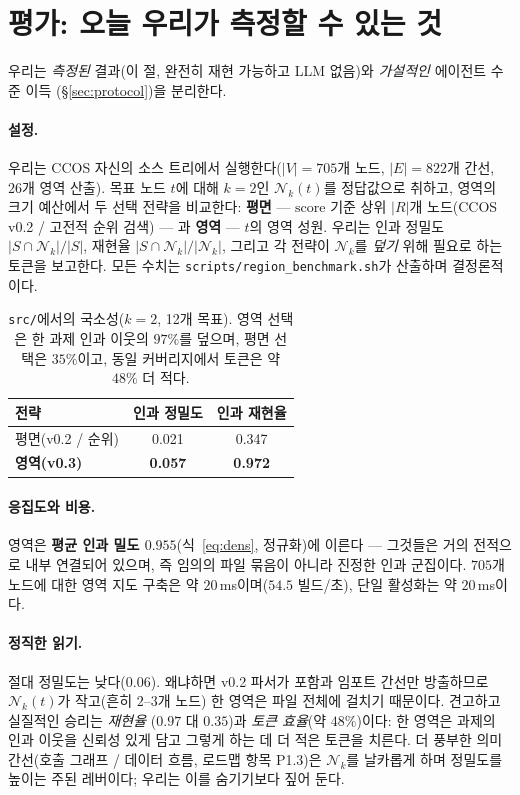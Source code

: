 \documentclass[11pt]{article}
\newcommand{\Nk}{\mathcal{N}_k}
\newcommand{\code}[1]{\texttt{#1}}
\begin{document}
\section{평가: 오늘 우리가 측정할 수 있는 것}\label{sec:eval}

우리는 \emph{측정된} 결과(이 절, 완전히 재현 가능하고 LLM 없음)와 \emph{가설적인} 에이전트 수준 이득
(\S\ref{sec:protocol})을 분리한다.

\paragraph{설정.} 우리는 CCOS 자신의 소스 트리에서 실행한다($|V|=705$개 노드, $|E|=822$개 간선, $26$개 영역
산출). 목표 노드 $t$에 대해 $k=2$인 $\Nk(t)$를 정답값으로 취하고, 영역의 크기 예산에서 두 선택 전략을 비교한다:
\textbf{평면} --- $\mathrm{score}$ 기준 상위 $|R|$개 노드(CCOS v0.2 / 고전적 순위 검색) --- 과 \textbf{영역}
--- $t$의 영역 성원. 우리는 인과 정밀도 $|S\cap\Nk|/|S|$, 재현율 $|S\cap\Nk|/|\Nk|$, 그리고 각 전략이 $\Nk$를
\emph{덮기} 위해 필요로 하는 토큰을 보고한다. 모든 수치는 \code{scripts/region\_benchmark.sh}가 산출하며
결정론적이다.

\begin{table}[h]
\centering
\begin{tabular}{lcc}
\toprule
전략 & 인과 정밀도 & 인과 재현율 \\
\midrule
평면(v0.2 / 순위) & 0.021 & 0.347 \\
\textbf{영역(v0.3)} & \textbf{0.057} & \textbf{0.972} \\
\bottomrule
\end{tabular}
\caption{\code{src/}에서의 국소성($k=2$, 12개 목표). 영역 선택은 한 과제 인과 이웃의 $97\%$를 덮으며, 평면
선택은 $35\%$이고, 동일 커버리지에서 토큰은 약 $48\%$ 더 적다.}
\label{tab:locality}
\end{table}

\paragraph{응집도와 비용.} 영역은 \textbf{평균 인과 밀도 $0.955$}(식~\ref{eq:dens}, 정규화)에 이른다 --- 그것들은
거의 전적으로 내부 연결되어 있으며, 즉 임의의 파일 묶음이 아니라 진정한 인과 군집이다. $705$개 노드에 대한 영역
지도 구축은 약 $20$\,ms이며($54.5$ 빌드/초), 단일 활성화는 약 $20$\,ms이다.

\paragraph{정직한 읽기.} 절대 정밀도는 낮다($0.06$). 왜냐하면 v0.2 파서가 포함과 임포트 간선만 방출하므로
$\Nk(t)$가 작고(흔히 $2$--$3$개 노드) 한 영역은 파일 전체에 걸치기 때문이다. 견고하고 실질적인 승리는 \emph{재현율}
($0.97$ 대 $0.35$)과 \emph{토큰 효율}(약 $48\%$)이다: 한 영역은 과제의 인과 이웃을 신뢰성 있게 담고 그렇게 하는 데
더 적은 토큰을 치른다. 더 풍부한 의미 간선(호출 그래프 / 데이터 흐름, 로드맵 항목 P1.3)은 $\Nk$를 날카롭게 하며
정밀도를 높이는 주된 레버이다; 우리는 이를 숨기기보다 짚어 둔다.
\end{document}
